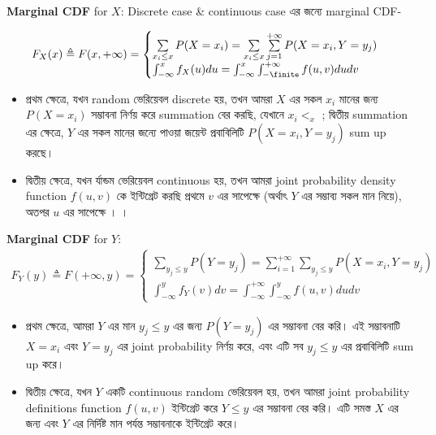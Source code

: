 \documentclass[graybox, envcountchap, twocolumn]{styles/svmult}
\begin{document}
\textbf{Marginal CDF} for $X$:
{\bengalifont Discrete case & continuous case এর জন্যে marginal  CDF-  }

\begin{equation}\begin{split}
F_X(x) \triangleq F(x,+\infty) = 
\begin{cases}
\sum\limits_{x_i \leq x} P(X=x_i) = \sum\limits_{x_i \leq x} \sum\limits_{j=1}^{+\infty} P(X=x_i,Y=y_j) \\
\int_{-\infty}^{x} f_X(u)du = \int_{-\infty}^{x} \int_{-\finite}^{+\infty} f(u, v) du dv
\end{cases}
\end{split}\end{equation}
\begin{itemize}
    \item {\bengalifont প্রথম ক্ষেত্রে, যখন random  ভেরিয়েবল discrete হয়, তখন আমরা $X$ এর সকল  $x_i$ মানের জন্য $P(X=x_i)$ সম্ভাবনা নির্ণয় করে summation বের করছি, যেখানে $x_i <_ x $ ; দ্বিতীয় summation এর ক্ষেত্রে, $Y$ এর সকল মানের জন্যে পাওয়া জয়েন্ট প্রবাবিলিটি  $P(X=x_i,Y=y_j)$ sum up  করছে।   }
    \item {\bengalifont দ্বিতীয় ক্ষেত্রে, যখন র্যান্ডম ভেরিয়েবল continuous হয়, তখন আমরা joint probability  density function $f(u,v)$ কে ইন্টিগ্রেট করছি প্রথমে $v$ এর সাপেক্ষে (অর্থাৎ $Y$ এর সম্ভাব্য সকল মান নিয়ে), অতপর $u$ এর সাপেক্ষে । ।}
\end{itemize}

\textbf{Marginal CDF} for $Y$:
\begin{equation}\begin{split}
F_Y(y) \triangleq F(+\infty, y) = 
\begin{cases}
\sum\limits_{y_j \leq y} P(Y=y_j) = \sum\limits_{i=1}^{+\infty} \sum\limits_{y_j \leq y} P(X=x_i,Y=y_j) \\
\int_{-\infty}^{y} f_Y(v) dv = \int_{-\infty}^{+\infty} \int_{-\infty}^{y} f(u, v) du dv
\end{cases}
\end{split}\end{equation}

\begin{itemize}
    \item {\bengalifont প্রথম ক্ষেত্রে, আমরা $Y$ এর মান $y_j \leq y$ এর জন্য $P(Y=y_j)$ এর সম্ভাবনা বের করি। এই সম্ভাবনাটি $X=x_i$ এবং $Y=y_j$ এর joint probability নির্ণয় করে, এবং এটি সব $y_j \leq y$ এর প্রবাবিলিটি sum  up করে। }
    \item {\bengalifont দ্বিতীয় ক্ষেত্রে, যখন $Y$ একটি continuous random ভেরিয়েবল হয়, তখন আমরা joint  probability definitions function  $f(u, v)$ ইন্টিগ্রেট করে $Y \leq y$ এর সম্ভাবনা বের করি। এটি সমস্ত $X$ এর জন্য এবং $Y$ এর নির্দিষ্ট মান পর্যন্ত সম্ভাবনাকে ইন্টিগ্রেট করে।}
\end{itemize}
\end{document}
